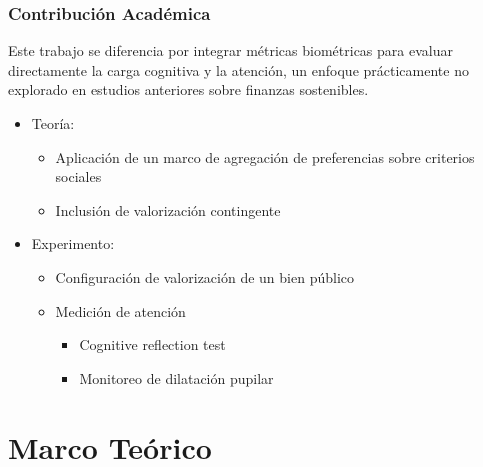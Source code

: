 \documentclass{beamer}
\begin{document}
\begin{frame}
    \frametitle{Contribución Académica}

     Este trabajo se diferencia por integrar métricas biométricas para evaluar directamente la carga cognitiva y la atención, un enfoque prácticamente no explorado en estudios anteriores sobre finanzas sostenibles.

\begin{itemize}
    \item Teoría: 
    \begin{itemize}
        \item Aplicación de un marco de agregación de preferencias sobre criterios sociales \cite{decancq_chapter_2015,burone_measuring_2023}
        \item Inclusión de valorización contingente \cite{cooper_one-and-one-half-bound_2002}
    \end{itemize}
    \item Experimento:
    \begin{itemize}
        \item Configuración de valorización de un bien público \cite{chan_cost-effective_2024}
        \item Medición de atención
        \begin{itemize}
            \item Cognitive reflection test \cite{frederick_cognitive_2005,sirota_effect_2018}
        \item Monitoreo de dilatación pupilar \cite{geller_gazer_2020}
        \end{itemize}        
    \end{itemize}
\end{itemize}
\end{frame}


\section{Marco Teórico}
\end{document}
